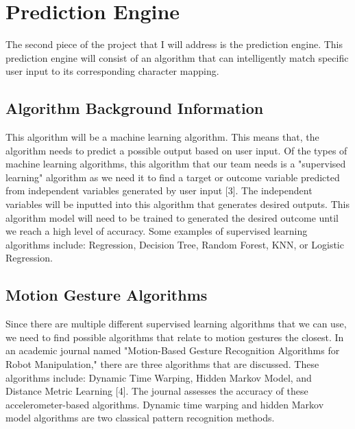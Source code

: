 \documentclass[onecolumn, draftclsnofoot,10pt, journal, letterpaper]{IEEEtran}
\begin{document}
\section{Prediction Engine}
    The second piece of the project that I will address is the prediction engine. This prediction engine will consist of an algorithm that can intelligently match specific user input to its corresponding character mapping. 
    
    \subsection{Algorithm Background Information}
        This algorithm will be a machine learning algorithm. This means that, the algorithm needs to predict a possible output based on user input. Of the types of machine learning algorithms, this algorithm that our team needs is a "supervised learning" algorithm as we need it to find a target or outcome variable predicted from independent variables generated by user input [3]. The independent variables will be inputted into this algorithm that generates desired outputs. This algorithm model will need to be trained to generated the desired outcome until we reach a high level of accuracy. Some examples of supervised learning algorithms include: Regression, Decision Tree, Random Forest, KNN, or Logistic Regression. 
    
    \subsection{Motion Gesture Algorithms}
        Since there are multiple different supervised learning algorithms that we can use, we need to find possible algorithms that relate to motion gestures the closest. In an academic journal named "Motion-Based Gesture Recognition Algorithms for Robot Manipulation," there are three algorithms that are discussed. These algorithms include: Dynamic Time Warping, Hidden Markov Model, and Distance Metric Learning [4]. The journal assesses the accuracy of these accelerometer-based algorithms. Dynamic time warping and hidden Markov model algorithms are two classical pattern recognition methods. 
    
\end{document}
